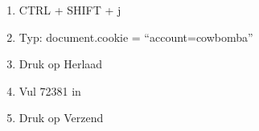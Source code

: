 \begin{enumerate}
  \item CTRL + SHIFT + j
  \item Typ: document.cookie = ``account=cowbomba''
  \item Druk op Herlaad
  \item Vul 72381 in
  \item Druk op Verzend
\end{enumerate}